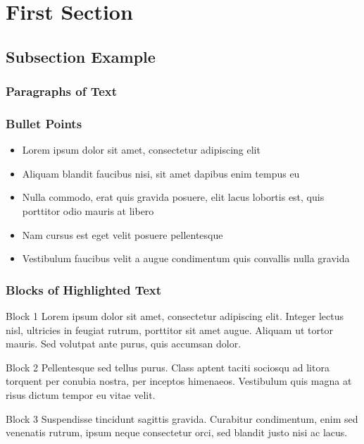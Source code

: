 \documentclass[14.5pt]{beamer}
\begin{document}

\section{First Section} 

\subsection{Subsection Example} 

\begin{frame}
\frametitle{Paragraphs of Text}

\end{frame}


\begin{frame}
\frametitle{Bullet Points}
\begin{itemize}
\item Lorem ipsum dolor sit amet, consectetur adipiscing elit
\item Aliquam blandit faucibus nisi, sit amet dapibus enim tempus eu
\item Nulla commodo, erat quis gravida posuere, elit lacus lobortis est, quis porttitor odio mauris at libero
\item Nam cursus est eget velit posuere pellentesque
\item Vestibulum faucibus velit a augue condimentum quis convallis nulla gravida
\end{itemize}
\end{frame}


\begin{frame}
\frametitle{Blocks of Highlighted Text}
\begin{block}{Block 1}
Lorem ipsum dolor sit amet, consectetur adipiscing elit. Integer lectus nisl, ultricies in feugiat rutrum, porttitor sit amet augue. Aliquam ut tortor mauris. Sed volutpat ante purus, quis accumsan dolor.
\end{block}

\begin{block}{Block 2}
Pellentesque sed tellus purus. Class aptent taciti sociosqu ad litora torquent per conubia nostra, per inceptos himenaeos. Vestibulum quis magna at risus dictum tempor eu vitae velit.
\end{block}

\begin{block}{Block 3}
Suspendisse tincidunt sagittis gravida. Curabitur condimentum, enim sed venenatis rutrum, ipsum neque consectetur orci, sed blandit justo nisi ac lacus.
\end{block}
\end{frame}
\end{document}

